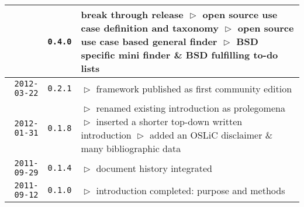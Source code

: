 \begin{table}
\begin{center}
\begin{tabular}{|r|c|p{9.4cm}|}
  & \texttt{0.4.0} 
  & break through release\newline
    $\vartriangleright$ open source use case definition and taxonomy\newline 
    $\vartriangleright$ open source use case based general finder\newline 
    $\vartriangleright$ BSD specific mini finder \& BSD fulfilling to-do lists\\
\hline
    \texttt{2012-03-22}
  & \texttt{0.2.1} 
  & $\vartriangleright$ framework published as first community edition\\
\hline
    \texttt{2012-01-31}
  & \texttt{0.1.8} 
  & $\vartriangleright$ renamed existing introduction as prolegomena\newline
    $\vartriangleright$ inserted a shorter top-down written introduction\newline
    $\vartriangleright$ added an OSLiC disclaimer \& many bibliographic data\\
\hline
    \texttt{2011-09-29}
  & \texttt{0.1.4} 
  & $\vartriangleright$ document history integrated\\
\hline
    \texttt{2011-09-12}
  & \texttt{0.1.0} 
  & $\vartriangleright$ introduction completed: purpose and methods \\
\hline
\hline 
\end{tabular}
\end{center}
\end{table}

%

